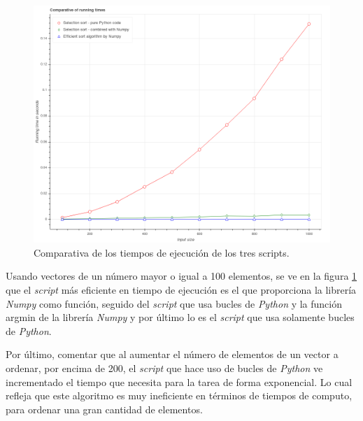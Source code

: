 \documentclass[12pt,twoside]{article}
\begin{document}
\begin{figure}[hbt]
\begin{center}
	\includegraphics[width=1\textwidth]{11.png}
	\caption{Comparativa de los tiempos de ejecución de los tres scripts.}
	\label{fig:fig1}
\end{center}
\end{figure}


Usando vectores de un número mayor o igual a 100 elementos, se ve en la figura \ref{fig:fig1} que el \textit{script} más eficiente en tiempo de ejecución es el que proporciona la librería \textit{Numpy} como función, seguido del \textit{script} que usa bucles de \textit{\textit{\textit{Python}}} y la función argmin de la librería \textit{Numpy} y por último lo es el \textit{script} que usa solamente bucles de \textit{\textit{\textit{Python}}}.

Por último, comentar que al aumentar el número de elementos de un vector a ordenar, por encima de 200, el \textit{script} que hace uso de bucles de \textit{Python} ve incrementado el tiempo que necesita para la tarea de forma exponencial. Lo cual refleja que este algoritmo es muy ineficiente en términos de tiempos de computo, para ordenar una gran cantidad de elementos.
 
\end{document}
